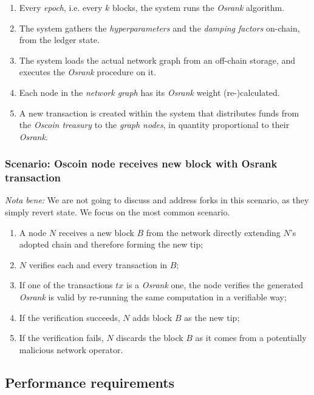 \documentclass{article}
\begin{document}
\begin{enumerate}
\item Every \textit{epoch}, i.e. every $k$ blocks, the system runs the
      \textit{Osrank} algorithm.
\item The system gathers the \textit{hyperparameters} and the
      \textit{damping factors} on-chain, from the ledger state.
\item The system loads the actual network graph from an off-chain storage,
      and executes the \textit{Osrank} procedure on it.
\item Each node in the \textit{network graph} has its \textit{Osrank} weight (re-)calculated.
\item A new transaction is created within the system that distributes funds
      from the \textit{Oscoin treasury} to the \textit{graph nodes}, in
      quantity proportional to their \textit{Osrank}.
\end{enumerate}

\subsubsection{Scenario: Oscoin node receives new block with Osrank transaction }

\textit{Nota bene:} We are not going to discuss and address forks in this
scenario, as they simply revert state. We focus on the most common scenario.

\begin{enumerate}
\item A node $N$ receives a new block $B$ from the network
      directly extending $N$'s adopted chain and therefore forming
      the new tip;
\item $N$ verifies each and every transaction in $B$;
\item If one of the transactions $tx$ is a \textit{Osrank} one, the node
      verifies the generated \textit{Osrank} is valid by re-running the
      same computation in a verifiable way;
\item If the verification succeeds, $N$ adds block $B$ as the new tip;
\item If the verification fails, $N$ discards the block $B$ as it
      comes from a potentially malicious network operator.

\end{enumerate}

\subsection{Performance requirements}
\end{document}
